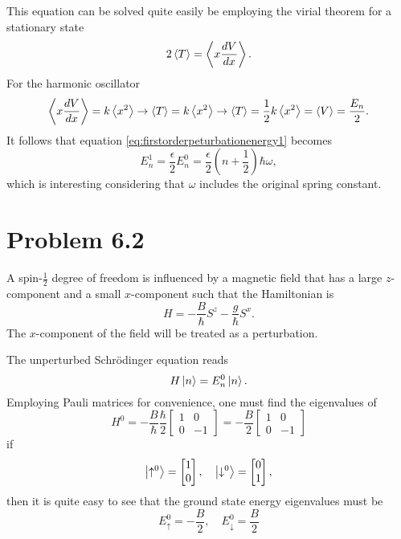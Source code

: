 \documentclass[11pt]{amsart}
\begin{document}
This equation can be solved quite easily be employing the virial theorem for a stationary state
\begin{equation}
\label{eq:virial}
2\ev{T} = \ev{x\frac{dV}{dx}}.
\end{equation}
For the harmonic oscillator
\begin{equation*}
\ev{x\frac{dV}{dx}}= k \ev{x^2} \rightarrow \ev{T} =  k \ev{x^2} \rightarrow \ev{T} = \frac{1}{2}k\ev{x^2} = \ev{V} = \frac{E_n}{2}.
\end{equation*}
It follows that equation \ref{eq:firstorderpeturbationenergy1} becomes
\begin{equation}
E_n^1 = \frac{\epsilon}{2}E_n^0 = \frac{\epsilon}{2}\left(n + \frac{1}{2} \right) \hbar \omega,
\end{equation}
which is interesting considering that $\omega$ includes the original spring constant.

\section*{Problem 6.2}
A spin-$\frac{1}{2}$ degree of freedom is influenced by a magnetic field that has a large $z$-component and a small $x$-component such that the Hamiltonian is
\begin{equation}
\label{eq:magHam}
H = -\frac{B}{\hbar}S^z-\frac{g}{\hbar}S^x.
\end{equation}
The $x$-component of the field will be treated as a perturbation.

The unperturbed Schrödinger equation reads 
\begin{equation}
H\ket{n} = E_n^0\ket{n}.
\end{equation}
Employing Pauli matrices for convenience, one must find the eigenvalues of
\begin{equation}
H^0=-\frac{B}{\hbar}\frac{\hbar}{2}
\begin{bmatrix}
1 & 0 \\
0 & -1
\end{bmatrix}
= -\frac{B}{2}
\begin{bmatrix}
1 & 0 \\
0 & -1
\end{bmatrix}
\end{equation}
if
\begin{equation}
\ket{\uparrow^0} = 
\begin{bmatrix}
1 \\ 0
\end{bmatrix}, \quad
\ket{\downarrow^0} = 
\begin{bmatrix}
0 \\ 1
\end{bmatrix},
\end{equation}
then it is quite easy to see that the ground state energy eigenvalues must be
\begin{equation}
E_\uparrow^0 = -\frac{B}{2}, \quad E_\downarrow^0 = \frac{B}{2}
\end{equation}
\end{document}
